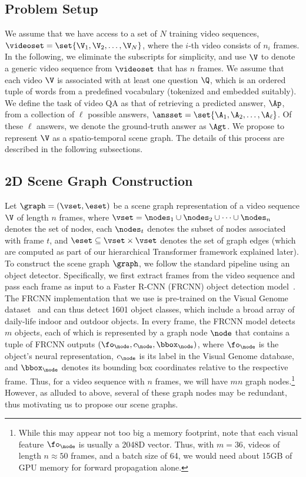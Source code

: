 \documentclass[letterpaper]{article} %
\begin{document}
\subsection{Problem Setup}
We assume that we have access to a set of $N$ training video sequences, $\videoset=\set{\V_1, \V_2, \dots, \V_N}$, where the $i$-th video consists of $n_i$ frames. In the following, we eliminate the subscripts for simplicity, and use $\V$ to denote a generic video sequence from $\videoset$ that has $n$ frames. We assume that each video $\V$ is associated with at least one question $\Q$, which is an ordered tuple of words from a predefined vocabulary (tokenized and embedded suitably). We define the task of video QA as that of retrieving a predicted answer, $\Ap$, from a collection of $\ell$ possible answers, $\ansset=\set{\A_1, \A_2, \dots, \A_\ell}$. Of these $\ell$ answers, we denote the ground-truth answer as $\Agt$. We propose to represent $\V$ as a \name spatio-temporal scene graph. The details of this process are described in the following subsections.

\subsection{2D Scene Graph Construction}
Let $\graph=(\vset, \eset)$ be a scene graph representation of a video sequence $\V$ of length $n$ frames, where $\vset = \nodes_1\cup \nodes_2\cup\cdots \cup\nodes_n$ denotes the set of nodes, each $\nodes_t$ denotes the subset of nodes associated with frame $t$, and $\eset\subseteq \vset\times \vset$ denotes the set of graph edges (which are computed as part of our hierarchical Transformer framework explained later). To construct the scene graph $\graph$, we follow the standard pipeline using an object detector. Specifically, we first extract frames from the video sequence and pass each frame as input to a Faster R-CNN (FRCNN) object detection model~\cite{ren2015faster}. The FRCNN implementation that we use is pre-trained on the Visual Genome dataset~\cite{anderson2018bottom} and can thus detect 1601 object classes, which include a broad array of daily-life indoor and outdoor objects. In every frame, the FRCNN model detects $m$ objects, each of which is represented by a graph node $\node$ that contains a tuple of FRCNN outputs $(\fo_\node, c_\node, \bbox_\node)$, where $\fo_\node$ is the object's neural representation, $c_\node$ is its label in the Visual Genome database, and $\bbox_\node$ denotes its bounding box coordinates relative to the respective frame. Thus, for a video sequence with $n$ frames, we will have $mn$ graph nodes.\footnote{While this may appear not too big a memory footprint, note that each visual feature $\fo_\node$ is usually a 2048D vector. Thus, with $m=36$, videos of length $n \approx 50$ frames, and a batch size of 64, we would need about 15GB of GPU memory for forward propagation alone.} However, as alluded to above, several of these graph nodes may be redundant, thus motivating us to propose our \name scene graphs.
\end{document}
